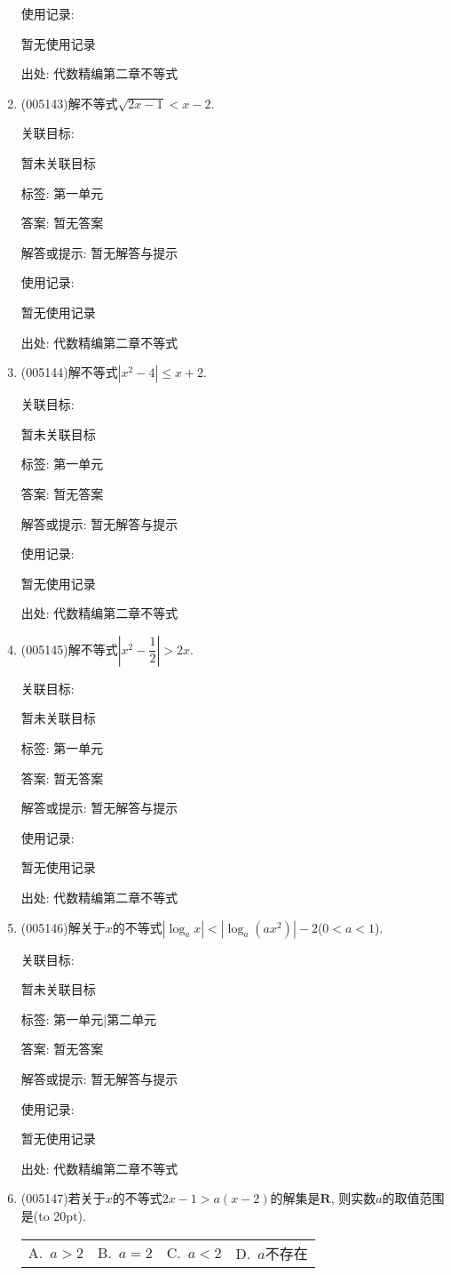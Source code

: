 \documentclass[10pt,a4paper]{article}
\newcommand{\bracket}[1]{(\hbox to #1pt{})}
\newcommand{\fourch}[4]{\par\begin{tabular}{p{.23\textwidth}p{.23\textwidth}p{.23\textwidth}p{.23\textwidth}}
A.~#1 &B.~#2& C.~#3& D.~#4
\end{tabular}}
\begin{document}
\begin{enumerate}[1.]
使用记录:

暂无使用记录


出处: 代数精编第二章不等式
\item { (005143)}解不等式$\sqrt{2x-1}<x-2$.


关联目标:

暂未关联目标



标签: 第一单元

答案: 暂无答案

解答或提示: 暂无解答与提示

使用记录:

暂无使用记录


出处: 代数精编第二章不等式
\item { (005144)}解不等式$|x^2-4|\le x+2$.


关联目标:

暂未关联目标



标签: 第一单元

答案: 暂无答案

解答或提示: 暂无解答与提示

使用记录:

暂无使用记录


出处: 代数精编第二章不等式
\item { (005145)}解不等式$|x^2-\dfrac 12|>2x$.


关联目标:

暂未关联目标



标签: 第一单元

答案: 暂无答案

解答或提示: 暂无解答与提示

使用记录:

暂无使用记录


出处: 代数精编第二章不等式
\item { (005146)}解关于$x$的不等式$|\log_ax|<|\log_a(ax^2)|-2$($0<a<1$).


关联目标:

暂未关联目标



标签: 第一单元|第二单元

答案: 暂无答案

解答或提示: 暂无解答与提示

使用记录:

暂无使用记录


出处: 代数精编第二章不等式
\item { (005147)}若关于$x$的不等式$2x-1>a(x-2)$的解集是$\mathbf{R}$, 则实数$a$的取值范围是\bracket{20}.
\fourch{$a>2$}{$a=2$}{$a<2$}{$a$不存在}



\end{enumerate}
\end{document}
